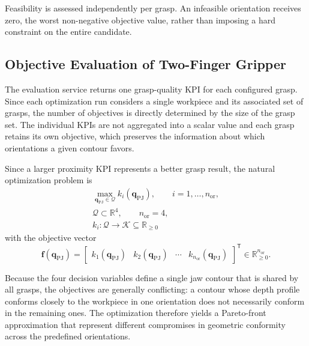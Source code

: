 Feasibility is assessed independently per grasp. An infeasible
orientation receives zero, the worst non-negative objective value,
rather than imposing a hard constraint on the entire candidate.

\subsection{Objective Evaluation of Two-Finger Gripper}
\label{sec:two_finger_objective_evaluation}

The evaluation service returns one grasp-quality KPI for each configured grasp. Since each optimization run considers a single workpiece and its
associated set of grasps, the number of objectives is directly determined by the size of the grasp set.
The individual KPIs are not aggregated into a scalar value and each grasp retains its own objective,
which preserves the information about which orientations a given contour favors.

Since a larger proximity KPI represents a better grasp result, the natural optimization problem is
\begin{equation}
    \begin{gathered}
        \max_{\mathbf{q}_{\mathrm{PJ}}\in\mathcal{Q}}
        k_i(\mathbf{q}_{\mathrm{PJ}}),
        \qquad i=1,\ldots,n_{\mathrm{or}},\\[4pt]
        \mathcal{Q}\subset\mathbb{R}^{4},
        \qquad n_{\mathrm{or}}=4,\\[2pt]
        k_i:\mathcal{Q}\rightarrow
        \mathcal{K}\subseteq\mathbb{R}_{\geq 0}
    \end{gathered}
\end{equation}
with the objective vector
\begin{equation}
    \mathbf{f}(\mathbf{q}_{\mathrm{PJ}})
    =
    \begin{bmatrix}
        k_1(\mathbf{q}_{\mathrm{PJ}}) &
        k_2(\mathbf{q}_{\mathrm{PJ}}) &
        \cdots &
        k_{n_{\mathrm{or}}}(\mathbf{q}_{\mathrm{PJ}})
    \end{bmatrix}^{\mathsf{T}}
    \in\mathbb{R}_{\geq 0}^{n_{\mathrm{or}}}.
\end{equation}

Because the four decision variables define a single jaw contour that is shared by all grasps, the
objectives are generally conflicting: a contour whose depth profile conforms closely to the
workpiece in one orientation does not necessarily conform in the remaining ones. The optimization
therefore yields a Pareto-front approximation that represent different compromises in geometric
conformity across the predefined orientations.

